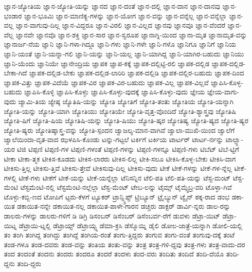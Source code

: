 {ಜ್ಞಾನ-ಜ್ಯೋತಿಯ
ಜ್ಞಾನ-ಜ್ಯೋತಿ-ಯನ್ನು
ಜ್ಞಾನದ
ಜ್ಞಾನ-ದಂತೆ
ಜ್ಞಾನ-ದಲ್ಲಿ
ಜ್ಞಾನ-ದಾನ
ಜ್ಞಾನ-ದಾನವು
ಜ್ಞಾನ-ಭಂಡಾರ
ಜ್ಞಾನ-ಭೂಮಿ
ಜ್ಞಾನ-ಮಾಣಿಕ್ಯ-ಗಳನ್ನು
ಜ್ಞಾನ-ಯೋಗ
ಜ್ಞಾನ-ವನ್ನು
ಜ್ಞಾನ-ವನ್ನೆಲ್ಲ
ಜ್ಞಾನ-ವನ್ನೆಲ್ಲಾ
ಜ್ಞಾನ-ವಲ್ಲ
ಜ್ಞಾನ-ವಾಗುವು-ದಿಲ್ಲ
ಜ್ಞಾನ-ವಿದ್ದರೂ
ಜ್ಞಾನ-ವಿರಲಿ
ಜ್ಞಾನ-ವಿಲ್ಲದ
ಜ್ಞಾನವು
ಜ್ಞಾನವೂ
ಜ್ಞಾನ-ವೆಂದರೆ
ಜ್ಞಾನ-ವೆಲ್ಲ
ಜ್ಞಾನವೇ
ಜ್ಞಾನವೊ
ಜ್ಞಾನ-ಶಕ್ತಿ
ಜ್ಞಾನ-ಸಾರ
ಜ್ಞಾನ-ಸ್ವರೂಪ
ಜ್ಞಾನಾಗ್ನಿ-ಯಿಂದ
ಜ್ಞಾನಾ-ಮೃತ
ಜ್ಞಾನಾಮೃತ-ವನ್ನು
ಜ್ಞಾನಾರ್ಜ-ನೆಯ
ಜ್ಞಾನಿ
ಜ್ಞಾನಿ-ಗಳಾ-ಗಿದ್ದೂ
ಜ್ಞಾನಿ-ಗಳು
ಜ್ಞಾನಿ-ಗಳೇ
ಜ್ಞಾನಿ-ಗಳೊ
ಜ್ಞಾನಿಗೂ
ಜ್ಞಾನಿಗೆ
ಜ್ಞಾನಿಯ
ಜ್ಞಾನಿ-ಯಂತೆ
ಜ್ಞಾನಿ-ಯನ್ನಾ-ಗಲಿ
ಜ್ಞಾನಿ-ಯನ್ನು
ಜ್ಞಾನಿ-ಯಲ್ಲ
ಜ್ಞಾನಿ-ಯಾಗಿದ್ದ
ಜ್ಞಾನಿ-ಯಾಗಿರ-ಬಹುದು
ಜ್ಞಾನಿಯು
ಜ್ಞಾನಿ-ಯೆಂದು
ಜ್ಞಾನಿಯೇ
ಜ್ಞಾನೇಂದ್ರಿಯ
ಜ್ಞಾಪಕ
ಜ್ಞಾಪ-ಕಕ್ಕೆ
ಜ್ಞಾಪಕ-ದಲ್ಲಿಟ್ಟಿ-ರಲಿ
ಜ್ಞಾಪಕ-ದಲ್ಲಿಡ
ಜ್ಞಾಪಕ-ದಲ್ಲಿಡ-ಬೇಕಾ-ಗಿದೆ
ಜ್ಞಾಪಕ-ದಲ್ಲಿಡ-ಬೇಕು
ಜ್ಞಾಪಕ-ದಲ್ಲಿಡ-ಲಾರಿರಿ
ಜ್ಞಾಪಕ-ದಲ್ಲಿಡಿ
ಜ್ಞಾಪಕ-ದಲ್ಲಿರ-ಬಹುದು
ಜ್ಞಾಪಕ-ದಿಂದ
ಜ್ಞಾಪಕ-ವಿತ್ತು
ಜ್ಞಾಪಕ-ವಿದೆಯೆ
ಜ್ಞಾಪಕ-ವಿರ
ಜ್ಞಾಪಕ-ವಿರ-ಬಹುದು
ಜ್ಞಾಪಕ-ವಿಲ್ಲ
ಜ್ಞಾಪಕ-ವಿಲ್ಲವೆ
ಜ್ಞಾಪಿಸಿ-ಕೊಳ್ಳ-ಬಹುದು
ಜ್ಞಾಪಿಸಿ-ಕೊಳ್ಳಿ
ಜ್ಞಾಪಿಸಿ-ಕೊಳ್ಳು
ಜ್ಞಾಪಿಸಿ-ಕೊಳ್ಳು-ವುದಕ್ಕೆ
ಜ್ಞಾಪಿಸಿ-ಕೊಳ್ಳು-ವುದು
ಜ್ಞೇಯ
ಜ್ಞೇಯ-ವಾಗು-ವುದು
ಜ್ಯಾಮಿ-ತಿಯ
ಜ್ಯೇಷ್ಠ
ಜ್ಯೊತಿಷಿ-ಯನ್ನು
ಜ್ಯೋತಿ
ಜ್ಯೋತಿಗೆ
ಜ್ಯೋತಿ-ತಂತು
ಜ್ಯೋತಿಯ
ಜ್ಯೋತಿ-ಯನ್ನಾಗಿ
ಜ್ಯೋತಿ-ಯನ್ನು
ಜ್ಯೋತಿ-ಯಾಗಿ
ಜ್ಯೋತಿಯು
ಜ್ಯೋತಿಯೇ
ಜ್ಯೋತಿ-ವೃತ್ತ-ವೊಂದಿದೆ
ಜ್ಯೋತಿ-ಶ್ಯಾಸ್ತ್ರವು
ಜ್ಯೋತಿಷಿ
ಜ್ಯೋತಿ-ಷಿಗೆ
ಜ್ಯೋತಿ-ಷಿಯ
ಜ್ಯೋತಿಷಿ-ಯನ್ನು
ಜ್ಯೋತಿ-ಷಿಯು
ಜ್ಯೋತಿ-ಷ್ಕರ
ಜ್ಯೋತಿಷ್ಯ
ಜ್ಯೋತಿ-ಷ್ಯದ
ಜ್ಯೋತಿ-ಷ್ಯರ
ಜ್ಯೋತಿ-ಷ್ಯರು
ಜ್ಯೋತಿಷ್ಶಾಸ್ತ್ರ-ವನ್ನು
ಜ್ಯೋತಿ-ಸ್ಪಂದನ
ಜ್ವಾಜಲ್ಯ-ಮಾನ-ವಾಗಿವೆ
ಜ್ವಾಲಾ-ಮುಖಿ-ಯಿಂದ
ಜ್ವಾಲೆಗೆ
ಜ್ವಾಲೆಯಿಂದಾ-ವೃತ-ವಾದ
ಝಳಪಿಸಿ-ಕೊಂಡು
ಟನ್ನು-ಗಟ್ಟಲೆ
ಟರ್ಕಿಗೆ
ಟರ್ಕಿಯ
ಟಾರ್ಟರ್
ಟಾರ್ಟ-ರ್ನನ್ನು
ಟಾಲ್ಸ್ಟಾ-ಯರ
ಟಿಜಿ
ಟಿಪ್ಪಣಿ
ಟಿಪ್ಪಣಿ-ಗಳ
ಟಿಪ್ಪಣಿ-ಗಳಂತೆ
ಟಿಪ್ಪಣಿ-ಗಳನ್ನು
ಟಿಪ್ಪಣಿ-ಗಳನ್ನೂ
ಟಿಪ್ಪಣಿ-ಗಳು
ಟಿಬೆಟ್
ಟಿಬೆ-ಟ್ಟಿಗೆ
ಟೀಕಾ
ಟೀಕಾ-ತ್ಮಕ
ಟೀಕಿಸ-ಕೂಡದು
ಟೀಕಿಸ-ಲಾರರು
ಟೀಕಿಸ-ಲಿಲ್ಲ
ಟೀಕಿ-ಸಲೂ
ಟೀಕಿಸಿ-ಕೊಳ್ಳ-ಬೇಕು
ಟೀಕಿಸಿ-ದಾಗ
ಟೀಕಿಸು-ತ್ತಿಲ್ಲ
ಟೀಕಿಸು-ತ್ತಿವೆ
ಟೀಕಿಸು-ತ್ತೇವೆ
ಟೀಕಿಸುವು-ದಿಲ್ಲ
ಟೀಕಿಸು-ವುದು
ಟೀಕೆ
ಟೀಕೆ-ಗಳನ್ನು
ಟೀಕೆ-ಗಳ-ನ್ನೆಲ್ಲ
ಟೀಕೆ-ಗಳಲ್ಲಿ
ಟೀಕೆ-ಗಳು
ಟೀಕೆಗೆ
ಟೀಕೆ-ಯನ್ನು
ಟೀಕೆ-ಯನ್ನೆಲ್ಲಾ
ಟೆನಿಸನ್ನಿನ
ಟೆಲಿ-ಪತಿ
ಟೆಲಿ-ಪತಿ-ಯನ್ನು
ಟೆಸ್ಟ-ಮಂಟ್
ಟೆಸ್ಟ-ಮೆಂಟಿ
ಟೆಸ್ಟಮೆಂಟಿ-ನಲ್ಲಿ
ಟೆಸ್ಟಮೆಂಟಿ-ನಲ್ಲೆಲ್ಲಾ
ಟೆಸ್ಟ-ಮೆಂಟ್
ಟೇಬ-ಲನ್ನು
ಟೈಮ್ಸ್
ಟೈಮ್ಸ್ಫೆಬ್ರ-ವರಿ
ಟೊಳ್ಳಾ-ಗಿವೆ
ಟೊಳ್ಳು-ಕಬ್ಬಿ-ಣದ
ಟೋಪಿಗೆ
ಟ್ಟರು-ಕೆಳಗೆ
ಟ್ಯೂಕರ್
ಟ್ರಾನ್ಸ್ಕ್ರಿಪ್ಟ್
ಟ್ರಿಬ್ಯೂನ್
ಟ್ರೈಬ್ಯುನ್
ಟ್ವೈನ್
ಠಕ್ಕ-ರಾದ
ಡಂಭ
ಡಕಾ-ಯಿತ
ಡಕಾಯಿತ-ನನ್ನೇ
ಡಕಾಯಿತ-ನಲ್ಲ
ಡಕಾಯಿತ-ಪಾಳೇ-ಗಾರನ
ಡಚ್ಚರು
ಡಾಕ್ಟರ್
ಡಾರ್ವಿ-ನ್ನರು
ಡಾಲ-ರನ್ನು
ಡಾಲರು-ಗಳನ್ನು
ಡಾಲರು-ಗಳಿಗೆ
ಡಿ
ಡಿಗ್ರಿ
ಡಿಸಂಬರ್
ಡಿಸೆಂಬರ್
ಡಿಸೆಂಬರ್ವ-ರೆಗೆ
ಡುವಳು
ಡೆಟ್ರಾ-ಯಿಟ್
ಡೆಟ್ರಾ-ಯಿಟ್ನ
ಡೆಟ್ರಾಯಿ-ಟ್ನಲ್ಲಿ
ಡೆಟ್ರಾಯ್ಟ್
ಡೆಟ್ರಾಯ್ಟ್ನ
ಡೆಮಾ-ಕ್ರಸಿ
ಡೆಸ್ಮೊಯ್ನಿ
ಡೈಲಿ
ಡೋಲ-ಜಾತ್ರೆ-ಯನ್ನಾಗಿ
ಡೋಲಿ-ಯಲ್ಲಿ
ತಂ
ತಂಗಿ
ತಂಗಿದ್ದ
ತಂಗಿದ್ದು
ತಂಗಿದ್ದೆ
ತಂಗಿಯ-ರಂತೆ
ತಂಗು-ತ್ತಿದ್ದರು
ತಂಗುವ
ತಂಗು-ವಂತೆ
ತಂಗುವು-ದಕ್ಕೆ
ತಂಟೆ
ತಂಡ-ಗಳೂ
ತಂಡ-ದವರು
ತಂಡ-ವನ್ನು
ತಂತಿಯ
ತಂತು-ವನ್ನು
ತಂತ್ರ
ತಂತ್ರ-ಗಳಿ-ದ್ದವು
ತಂತ್ರ-ಗಳು
ತಂತ್ರ-ವಾದು-ದರ
ತಂದ
ತಂದಂತೆ
ತಂದನು
ತಂದರು
ತಂದರೂ
ತಂದರೆ
ತಂದಳು
ತಂದ-ವರು
ತಂದಿತು
ತಂದಿದೆ
ತಂದಿ-ದೆಯೊ
ತಂದಿ-ದ್ದನು
ತಂದಿ-ದ್ದರು
}

